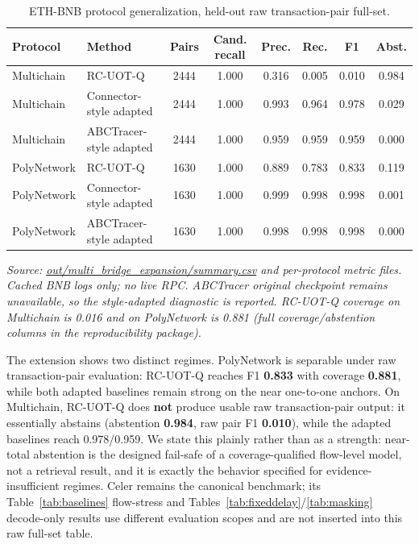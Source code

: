 \begin{table}[!t]
\caption{ETH-BNB protocol generalization, held-out raw transaction-pair full-set.}
\label{tab:generalization}
\centering
\footnotesize
\setlength{\tabcolsep}{3pt}
\begin{tabular}{p{}p{}cccccc}
\toprule
Protocol & Method & Pairs & Cand. recall & Prec. & Rec. & F1 & Abst. \\
\midrule
Multichain & RC-UOT-Q & 2444 & 1.000 & 0.316 & 0.005 & 0.010 & 0.984 \\
Multichain & Connector-style adapted & 2444 & 1.000 & 0.993 & 0.964 & 0.978 & 0.029 \\
Multichain & ABCTracer-style adapted & 2444 & 1.000 & 0.959 & 0.959 & 0.959 & 0.000 \\
PolyNetwork & RC-UOT-Q & 1630 & 1.000 & 0.889 & 0.783 & 0.833 & 0.119 \\
PolyNetwork & Connector-style adapted & 1630 & 1.000 & 0.999 & 0.998 & 0.998 & 0.001 \\
PolyNetwork & ABCTracer-style adapted & 1630 & 1.000 & 0.998 & 0.998 & 0.998 & 0.000 \\
\bottomrule
\end{tabular}
\end{table}

\emph{Source: \url{out/multi_bridge_expansion/summary.csv} and per-protocol metric files. Cached BNB logs only; no live RPC. ABCTracer original checkpoint remains unavailable, so the style-adapted diagnostic is reported. RC-UOT-Q coverage on Multichain is 0.016 and on PolyNetwork is 0.881 (full coverage/abstention columns in the reproducibility package).}

The extension shows two distinct regimes. PolyNetwork is separable under raw transaction-pair evaluation: RC-UOT-Q reaches F1 \textbf{0.833} with coverage \textbf{0.881}, while both adapted baselines remain strong on the near one-to-one anchors. On Multichain, RC-UOT-Q does \textbf{not} produce usable raw transaction-pair output: it essentially abstains (abstention \textbf{0.984}, raw pair F1 \textbf{0.010}), while the adapted baselines reach 0.978/0.959. We state this plainly rather than as a strength: near-total abstention is the designed fail-safe of a coverage-qualified flow-level model, not a retrieval result, and it is exactly the behavior specified for evidence-insufficient regimes. Celer remains the canonical benchmark; its Table~\ref{tab:baselines} flow-stress and Tables~\ref{tab:fixeddelay}/\ref{tab:masking} decode-only results use different evaluation scopes and are not inserted into this raw full-set table.

